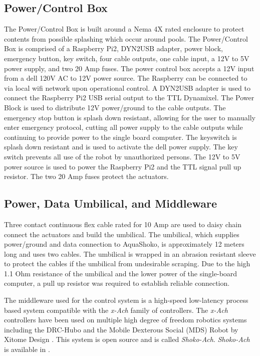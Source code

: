 \subsection{Power/Control Box}
The Power/Control Box is built around a Nema 4X rated enclosure to protect contents from possible splashing which occur around pools. The Power/Control Box is comprised of a Raspberry Pi2, DYN2USB adapter, power block, emergency button, key switch, four cable outputs, one cable input, a 12V to 5V power supply, and two 20 Amp fuses. The power control box accepts a 12V input from a dell 120V AC to 12V power source.
The Raspberry can be connected to via local wifi network upon operational control. 
A DYN2USB adapter is used to connect the Raspberry Pi2 USB serial output to the TTL Dynamixel. 
The Power Block is used to distribute 12V power/ground to the cable outputs.
The emergency stop button is splash down resistant, allowing for the user to manually enter emergency protocol, cutting all power supply to the cable outputs while continuing to provide power to the single board computer.
The keyswitch is splash down resistant and is used to activate the dell power supply. The key switch prevents all use of the robot by unauthorized persons. The 12V to 5V power source is used to power the Raspberry Pi2 and the TTL signal pull up resistor.
The two 20 Amp fuses protect the actuators.


\subsection{Power, Data Umbilical, and Middleware}
Three contact continuous flex cable rated for 10 Amp are used to daisy chain connect the actuators and build the umbilical. %
The umbilical, which supplies power/ground and data connection to AquaShoko, is approximately 12 meters long and uses two cables. The umbilical is wrapped in an abrasion resistant sleeve to protect the cables if the umbilical from undesirable scraping. Due to the high 1.1 Ohm resistance of the umbilical and the lower power of the single-board computer, a pull up resistor was required to establish reliable connection. 

The middleware used for the control system is a high-speed low-latency process based system compatible with the \textit{x-Ach} family of controllers.  The \textit{x-Ach} controllers have been used on multiple high degree of freedom robotics systems including the DRC-Hubo and the Mobile Dexterous Social (MDS) Robot by Xitome Design \cite{lofaro-2015-ieee-ram-hubo-ach,lofaro-2018-ieee-amc-legacy-robots}.
This system is open source and is called \textit{Shoko-Ach}.
\textit{Shoko-Ach} is available in \cite{shokoACH}. 


